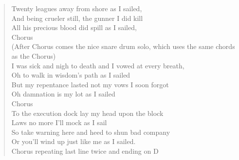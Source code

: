 \documentclass[11pt]{article}
\begin{document}
\begin{verse}
Twenty leagues away from shore as I sailed,\\
And being crueler still, the gunner I did kill\\
All his precious blood did spill as I sailed,\\
\vspace*{1em}
Chorus\\
(After Chorus comes the nice snare drum solo, which uses the same chords as the Chorus)\\
\vspace*{1em}
I was sick and nigh to death and I vowed at every breath,\\
Oh to walk in wisdom's path as I sailed\\
But my repentance lasted not my vows I soon forgot\\
Oh damnation is my lot as I sailed\\
\vspace*{1em}
Chorus\\
\vspace*{1em}
To the execution dock lay my head upon the block\\
Laws no more I'll mock as I sail\\
So take warning here and heed to shun bad company\\
Or you'll wind up just like me as I sailed.\\
\vspace*{1em}
Chorus repeating last line twice and ending on D\\
\end{verse}
\clearpage
\end{document}

